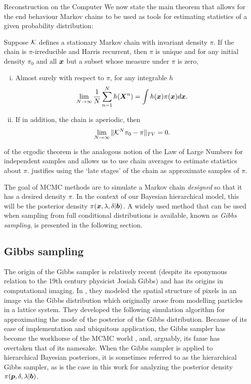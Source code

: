 \begin{chapter}{Reconstruction on the Computer}
We now state the main theorem that allows for the end behaviour Markov chains to be used as tools for estimating statistics of a given probability distribution:
\begin{thm}
  \citep{tierney1994markov} Suppose $\mathcal K$ defines a stationary Markov chain with invariant density $\pi$. If the chain is $\pi$-irreducible and Harris recurrent, then $\pi$ is unique and for any initial density $\pi_0$ and all $\mbox{\boldmath$x$}$ but a subset whose measure under $\pi$ is zero,
  \begin{enumerate}[(i)]
    \item Almost surely with respect to $\pi$, for any integrable $h$ \begin{equation} \lim_{N\to \infty}\frac 1N\sum_{n=1}^N h(\mbox{\boldmath$X$}^n) = \int h(\mbox{\boldmath$x$}) \pi(\mbox{\boldmath$x$}) d\mbox{\boldmath$x$}. \label{eq:ergodicStat}\end{equation}
    \item If in addition, the chain is aperiodic, then \begin{equation} \lim_{N\to \infty}\|\mathcal K^N\pi_0 - \pi\|_{TV} = 0. \label{eq:ergodicDist}\end{equation}
  \end{enumerate}
\end{thm}
 of the ergodic theorem  is the analogous notion of the Law of Large Numbers for independent samples and allows us to use chain averages to estimate statistics about $\pi$.  
 justifies using the `late stages' of the chain as approximate samples of $\pi$.

The goal of MCMC methods are to simulate a Markov chain \emph{designed} so that it has a desired density $\pi$.  
In the context of our Bayesian hierarchical model, this will be the posterior density $\pi(\mbox{\boldmath$x$}, \lambda, \delta| \mbox{\boldmath$b$})$.
A widely used method that can be used when sampling from full conditional distributions is available, known as \emph{Gibbs sampling}, is presented in the following section.

\subsection{Gibbs sampling}

The origin of the Gibbs sampler is relatively recent (despite its eponymous relation to the 19th century physicist Josiah Gibbs) and has its origins in computational imaging. 
In \citep{geman1984stochastic}, they modeled the spatial structure of pixels in an image via the Gibbs distribution which originally arose from modelling particles in a lattice system.
They developed the following simulation algorithm for approximating the mode of the posterior of the Gibbs distribution.
Because of its ease of implementation and ubiquitous application, the Gibbs sampler has become the workhorse of the MCMC world \citep{robert2013monte}, and, arguably, its fame has overtaken that of its namesake.
When the Gibbs sampler is applied to hierarchical Bayesian posteriors, it is sometimes referred to as the hierarchical Gibbs sampler, as is the case in this work for analyzing the posterior density $\pi(\mbox{\boldmath$p$},\delta,\lambda|\mbox{\boldmath$b$})$.



\end{chapter}
